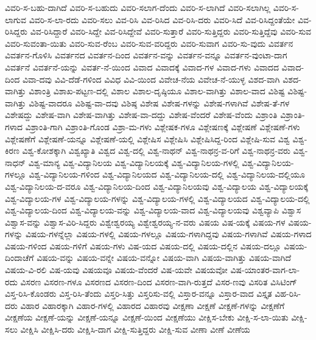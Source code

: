 {ವಿವರಿ-ಸ-ಬಹು-ದಾಗಿದೆ
ವಿವರಿ-ಸ-ಬಹುದು
ವಿವರಿ-ಸಲಾಗ-ದೆಂದು
ವಿವರಿ-ಸ-ಲಾಗಿದೆ
ವಿವರಿ-ಸಲಾಗಿಲ್ಲ
ವಿವರಿ-ಸ-ಲಾಗುವ
ವಿವರಿ-ಸ-ಲಾ-ರದು
ವಿವರಿ-ಸಲು
ವಿವ-ರಿಸಿ
ವಿವ-ರಿಸಿದ
ವಿವ-ರಿಸಿ-ದರು
ವಿವರಿ-ಸಿದೆ
ವಿವ-ರಿಸಿದ್ದಂತೆಯೇ
ವಿವ-ರಿಸಿದ್ದರು
ವಿವ-ರಿಸಿದ್ದಾರೆ
ವಿವರಿ-ಸಿದ್ದೇ
ವಿವ-ರಿಸಿದ್ದೇವೆ
ವಿವರಿ-ಸುತ್ತಾರೆ
ವಿವರಿ-ಸುತ್ತಿದ್ದರು
ವಿವರಿ-ಸುತ್ತಿದ್ದೆವು
ವಿವರಿ-ಸುವ
ವಿವರಿ-ಸುವಂತಾ-ಯಿತು
ವಿವರಿ-ಸುವ-ರೆಂಬ
ವಿವರಿ-ಸುವ-ವರಿದ್ದರು
ವಿವರಿ-ಸುವಾಗ
ವಿವರಿ-ಸು-ವುದು
ವಿವರ್ತನ
ವಿವರ್ತನ-ಗೊಳಿಸಿ
ವಿವರ್ತನದ
ವಿವರ್ತನ-ದಿಂದ
ವಿವರ್ತನ-ವನ್ನು
ವಿವರ್ತನ-ವನ್ನೂ
ವಿವರ್ತನ-ವುಂಟಾ-ದಾಗ
ವಿವರ್ತನೆ
ವಿವರ್ತನೆ-ಯನ್ನು
ವಿವರ್ತ-ನೆ-ಯಿಂದ
ವಿವಾದ
ವಿವಾದಕ್ಕೆ
ವಿವಾದ-ಗಳ
ವಿವಾದ-ಗಳು
ವಿವಾದದ
ವಿವಾದ-ದಿಂದ
ವಿವಾ-ದವು
ವಿವಿ-ದೆಡೆ-ಗಳಿಂದ
ವಿವಿಧ
ವಿವಿ-ಯಿಂದ
ವಿವೇಚ-ನೆಯ
ವಿವೇಚ-ನೆ-ಯುಳ್ಳ
ವಿಶದ-ವಾಗಿ
ವಿಶದ-ವಾಗಿತ್ತು
ವಿಶಾಂತ್ರಿ
ವಿಶಾಖ-ಪಟ್ಟಣ-ದಲ್ಲಿ
ವಿಶಾಲ
ವಿಶಾಲ-ದೃಷ್ಠಿಯೂ
ವಿಶಾಲ-ವಾಗಿತ್ತು
ವಿಶಾಲ-ವಾದ
ವಿಶಿಷ್ಟ
ವಿಶಿಷ್ಟ-ವಾಗಿತ್ತು
ವಿಶಿಷ್ಟ-ವಾದರೂ
ವಿಶಿಷ್ಟ-ವಾ-ದವು
ವಿಶಿಷ್ಠ
ವಿಶೇಷ
ವಿಶೇಷ-ಗಳನ್ನು
ವಿಶೇಷ-ಗಳಾಗಿವೆ
ವಿಶೇಷ-ತೆ-ಗಳ
ವಿಶೇಷದ್ದು
ವಿಶೇಷ-ವಾಗಿ
ವಿಶೇಷ-ವಾಗಿತ್ತು
ವಿಶೇಷ-ವಾ-ದದ್ದು
ವಿಶೇಷ-ವೆಂದರೆ
ವಿಶೇಷ-ವೆಂದು
ವಿಶ್ರಾಂತಿ
ವಿಶ್ರಾಂತಿ-ಗಳಾದ
ವಿಶ್ರಾಂತಿ-ಗಾಗಿ
ವಿಶ್ರಾಂತಿ-ಗೊಂಡ
ವಿಶ್ರಾ-ಮ-ಗಳು
ವಿಶ್ಲೇಷಕ-ಗಳೂ
ವಿಶ್ಲೇಷಣಕ್ಕೆ
ವಿಶ್ಲೇಷಣೆ
ವಿಶ್ಲೇಷಣೆ-ಗಳು
ವಿಶ್ಲೇಷಣೆಗೆ
ವಿಶ್ಲೇಷಣೆ-ಯನ್ನೂ
ವಿಶ್ಲೇಷಣೆ-ಯಲ್ಲಿ
ವಿಶ್ಲೇಷಿಸ
ವಿಶ್ಲೇಷಿಸಿ
ವಿಶ್ಲೇಷಿಸಿದ್ದ-ರಿಂದ
ವಿಶ್ಲೇಷಿ-ಸುವ
ವಿಶ್ವ
ವಿಶ್ವ-ಕಿರಣ
ವಿಶ್ವ-ಕೋಶಕ್ಕಾಗಿ
ವಿಶ್ವಖ್ಯಾತಿ
ವಿಶ್ವದ
ವಿಶ್ವ-ದಲ್ಲಿ
ವಿಶ್ವ-ನಾಥನ್
ವಿಶ್ವ-ನಾಥನ್ರ-ವ-ರಿಗೆ
ವಿಶ್ವ-ನಾಥನ್ರ-ವರು
ವಿಶ್ವ-ನಾಧನ್
ವಿಶ್ವ-ಮಾನ್ಯ
ವಿಶ್ವ-ವಿದ್ಯಾನಿಲಯ
ವಿಶ್ವ-ವಿದ್ಯಾನಿಲಯಕ್ಕೆ
ವಿಶ್ವ-ವಿದ್ಯಾನಿಲಯ-ಗಳಲ್ಲಿ
ವಿಶ್ವ-ವಿದ್ಯಾನಿಲಯ-ಗಳಲ್ಲೂ
ವಿಶ್ವ-ವಿದ್ಯಾನಿಲಯ-ಗಳಿಂದ
ವಿಶ್ವ-ವಿದ್ಯಾನಿಲಯದ
ವಿಶ್ವ-ವಿದ್ಯಾನಿಲಯ-ದಲ್ಲಿ
ವಿಶ್ವ-ವಿದ್ಯಾನಿಲಯ-ದಲ್ಲಿಯೂ
ವಿಶ್ವ-ವಿದ್ಯಾನಿಲಯ-ದ-ವರೂ
ವಿಶ್ವ-ವಿದ್ಯಾನಿಲಯ-ದಿಂದ
ವಿಶ್ವ-ವಿದ್ಯಾನಿಲಯವು
ವಿಶ್ವ-ವಿದ್ಯಾಲಯ
ವಿಶ್ವ-ವಿದ್ಯಾಲಯಕ್ಕೆ
ವಿಶ್ವ-ವಿದ್ಯಾಲಯ-ಗಳ
ವಿಶ್ವ-ವಿದ್ಯಾಲಯ-ಗಳನ್ನು
ವಿಶ್ವ-ವಿದ್ಯಾಲಯ-ಗಳಲ್ಲಿ
ವಿಶ್ವ-ವಿದ್ಯಾಲಯದ
ವಿಶ್ವ-ವಿದ್ಯಾಲಯ-ದಲ್ಲಿ
ವಿಶ್ವ-ವಿದ್ಯಾಲಯ-ದಿಂದ
ವಿಶ್ವ-ವಿದ್ಯಾಲಯ-ವನ್ನು
ವಿಶ್ವ-ವಿದ್ಯಾಲಯ-ವಾದ
ವಿಶ್ವ-ವಿದ್ಯಾಲಯವು
ವಿಶ್ವವ್ಯಾಪಿ
ವಿಶ್ವಾಸ
ವಿಶ್ವಾಸ-ವನ್ನು
ವಿಶ್ವಾಸ-ವಿರಿ-ಸಿದ್ದರು
ವಿಶ್ವೇಶ್ವರಯ್ಯ
ವಿಶ್ವೇಶ್ವರಯ್ಯ-ನ-ವರು
ವಿಷಯ
ವಿಷ-ಯಕ್ಕೆ
ವಿಷಯ-ಗಳ
ವಿಷಯ-ಗಳನ್ನು
ವಿಷಯ-ಗಳನ್ನೆಲ್ಲಾ
ವಿಷಯ-ಗಳಲ್ಲಿ
ವಿಷಯ-ಗಳಲ್ಲೂ
ವಿಷಯ-ಗಳಾಗಿದ್ದವು
ವಿಷಯ-ಗಳಾಗಿವೆ
ವಿಷಯ-ಗಳಾದ
ವಿಷಯ-ಗಳಿಂದ
ವಿಷಯ-ಗಳಿಗೆ
ವಿಷಯ-ಗಳು
ವಿಷ-ಯದ
ವಿಷಯ-ದಲ್ಲಿ
ವಿಷಯ-ದಲ್ಲಿನ
ವಿಷಯ-ದಲ್ಲೂ
ವಿಷಯ-ದಿಂದಾಚೆಗೆ
ವಿಷಯ-ವನ್ನು
ವಿಷಯ-ವನ್ನೇ
ವಿಷಯ-ವನ್ನೋ
ವಿಷಯ-ವಾಗಿ
ವಿಷಯ-ವಾಗಿತ್ತು
ವಿಷಯ-ವಾಗಿದೆ
ವಿಷಯ-ವಿ-ರಲಿ
ವಿಷ-ಯವು
ವಿಷಯವೂ
ವಿಷಯ-ವೆಂದರೆ
ವಿಷ-ಯವೇ
ವಿಷಯವೋ
ವಿಷ-ಯಾಂತರ-ವಾಗ-ಲಾ-ರದು
ವಿಸರಣ
ವಿಸರಣ-ಗಳೂ
ವಿಸರಣದ
ವಿಸರಣ-ದಿಂದ
ವಿಸರಣ-ವಾಗಿ-ರುತ್ತದೆ
ವಿಸರ-ಣವು
ವಿಸರಿತ
ವಿಸಿಟಿಂಗ್
ವಿಸ್ತ-ರಿಸಿ-ಕೊಂಡರು
ವಿಸ್ತ-ರಿಸಿ-ತೆಂದು
ವಿಸ್ತರಿ-ಸಿತ್ತು
ವಿಸ್ತರಿಸು-ವಲ್ಲಿ
ವಿಸ್ತಾರ-ವನ್ನೂ
ವಿಸ್ತಾರ-ವಾದ
ವಿಸ್ತೃತ
ವಿಹ-ರಿಸಿ-ದರು
ವಿಹಾರ
ವಿಹಾರಕ್ಕಾಗಿ
ವಿಹಾರ-ಗಳಲ್ಲಿ
ವಿಹಾರದ
ವಿಹಾರವು
ವೀಕ್ಷಣಾ
ವೀಕ್ಷಣೆ
ವೀಕ್ಷಣೆ-ಗಳನ್ನು
ವೀಕ್ಷಣೆಗೆ
ವೀಕ್ಷಣೆಯ
ವೀಕ್ಷಣೆ-ಯನ್ನು
ವೀಕ್ಷಣೆ-ಯನ್ನೂ
ವೀಕ್ಷಣೆ-ಯಿಂದ
ವೀಕ್ಷಣೆಯು
ವೀಕ್ಷಿಸ-ಬೇಕು
ವೀಕ್ಷಿ-ಸ-ಲಾ-ಯಿತು
ವೀಕ್ಷಿ-ಸಲು
ವೀಕ್ಷಿಸಿ
ವೀಕ್ಷಿಸಿ-ದರು
ವೀಕ್ಷಿಸಿ-ದಾಗ
ವೀಕ್ಷಿ-ಸುತ್ತಿದ್ದರು
ವೀಕ್ಷಿ-ಸುವ
ವೀಣಾ
ವೀಣೆ
ವೀಣೆಯ
}
